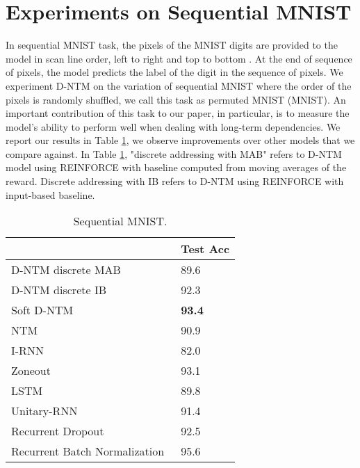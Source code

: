 \documentclass[12pt]{article}
\begin{document}
\section{Experiments on Sequential MNIST}


In sequential MNIST task, the pixels of the MNIST digits are provided to the model in scan line order, left to right and top to bottom \citep{le2015simple}. At the end of sequence of pixels, the model predicts the label of the digit in the sequence of pixels. We experiment D-NTM on the variation of sequential MNIST where the order of the pixels is randomly shuffled, we call this task as permuted MNIST (MNIST). An important contribution of this task to our paper, in particular, is to measure the model's ability to perform well when dealing with long-term dependencies. We report our results in Table \ref{tbl:pmnist_dntm_comp}, we observe improvements over other models that we compare against. In Table \ref{tbl:pmnist_dntm_comp}, "discrete addressing with MAB" refers to D-NTM model using REINFORCE with baseline computed from moving averages of the reward. Discrete addressing with IB refers to D-NTM using REINFORCE with input-based baseline.

\begin{table}[htbp]
\centering
\footnotesize
\begin{tabular}{@{}ll@{}}
\toprule
                                                    & Test  Acc \\ \midrule
D-NTM discrete MAB     & 89.6   \\
D-NTM discrete  IB      &  92.3  \\ Soft D-NTM                          & \textbf{93.4}           \\
NTM                                               & 90.9          \\\midrule
I-RNN~\citep{le2015simple}                                & 82.0           \\
Zoneout~\citep{krueger2016zoneout}                                             & 93.1           \\
LSTM~\citep{krueger2016zoneout}                                               & 89.8           \\
Unitary-RNN~\citep{arjovsky2015unitary}                  & 91.4           \\
Recurrent Dropout~\citep{krueger2016zoneout}                                   & 92.5           \\ 
Recurrent Batch Normalization~\citep{cooijmans2016recurrent}    & 95.6 \\ \bottomrule
\end{tabular}
\caption{ Sequential MNIST.}
\label{tbl:pmnist_dntm_comp}

\end{table}
\end{document}
